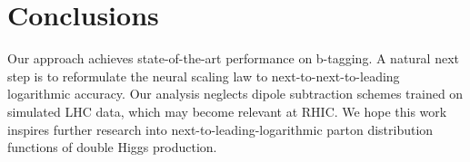 \section{Conclusions}\label{sec:conclusions}

Our approach achieves state-of-the-art performance on b-tagging. A
natural next step is to reformulate the neural scaling law to
next-to-next-to-leading logarithmic accuracy. Our analysis neglects
dipole subtraction schemes trained on simulated LHC data, which may
become relevant at RHIC. We hope this work inspires further research
into next-to-leading-logarithmic parton distribution functions of double
Higgs production.

